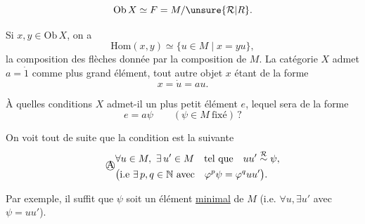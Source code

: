 
\[
\mathrm{Ob}\,X\simeq F=M/\unsure{\mathcal R|R}.
\]

Si $x,y\in\mathrm{Ob}\,X$, on a
\[
\mathrm{Hom}(x,y)\simeq\{u\in M\mid x=yu\},
\]
la composition des flèches  donnée par la composition de $M$. La catégorie $X$ admet $a=\dot 1$ comme plus grand élément, tout autre objet $x$ étant de la forme
\[
x=\dot u=au.
\]

À quelles conditions $X$ admet-il un plus petit élément $e$, lequel sera de la forme
\[
e=a\psi\qquad(\psi\in M\ \text{fixé})\,?
\]

On voit tout de suite que la condition est la suivante
\[
\tag*{\textcircled{A}}\begin{aligned}&\forall u\in M,\ \exists\,u'\in M\quad\text{tel que}\quad uu'\overset{\mathcal R}\sim\psi,\\ &\bigl(\text{i.e }\exists\,p,q\in\mathbb N\ \text{avec}\quad \varphi^p\psi=\varphi^q uu'\bigr).\end{aligned}
\]

Par exemple, il suffit que $\psi$ soit un élément \uline{minimal} de $M$ (i.e. $\forall u,\exists u'$ avec $\psi=uu'$).

